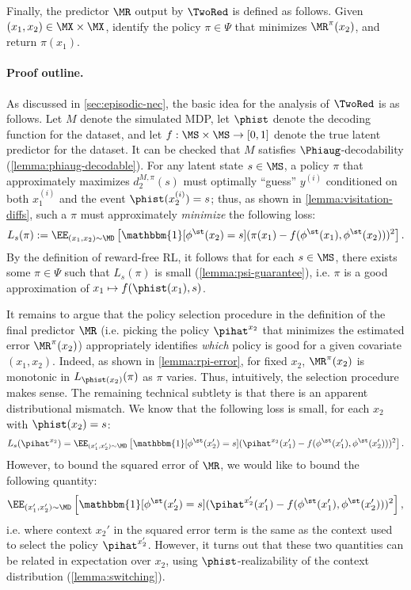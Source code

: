 Finally, the predictor $\MR$ output by $\TwoRed$ is defined as follows. Given $(x_1,x_2) \in \MX\times\MX$, identify the policy $\pi\in\Psi$ that minimizes $\MR^\pi(x_2)$, and return $\pi(x_1)$.

\paragraph{Proof outline.} As discussed in \cref{sec:episodic-nec}, the basic idea for the analysis of $\TwoRed$ is as follows. Let $M$ denote the simulated MDP, let $\phist$ denote the decoding function for the dataset, and let $f:\MS\times\MS\to[0,1]$ denote the true latent predictor for the dataset. It can be checked that $M$ satisfies $\Phiaug$-decodability (\cref{lemma:phiaug-decodable}). For any latent state $s \in \MS$, a policy $\pi$ that approximately maximizes $d^{M,\pi}_2(s)$ must optimally ``guess'' $y^{(i)}$ conditioned on both $x_1^{(i)}$ and the event $\phist(x_2^{(i)}) = s$; thus, as shown in \cref{lemma:visitation-diffs}, such a $\pi$ must approximately \emph{minimize} the following loss:
\[L_s(\pi) := \EE_{(x_1,x_2) \sim \MD} \left[\mathbbm{1}[\phi^\st(x_2) = s] (\pi(x_1) - f(\phi^\st(x_1),\phi^\st(x_2)))^2\right].\]
By the definition of reward-free RL, it follows that for each $s \in \MS$, there exists some $\pi \in \Psi$ such that $L_s(\pi)$ is small (\cref{lemma:psi-guarantee}), i.e. $\pi$ is a good approximation of $x_1 \mapsto f(\phist(x_1),s)$. 

It remains to argue that the policy selection procedure in the definition of the final predictor $\MR$ (i.e. picking the policy $\pihat^{x_2}$ that minimizes the estimated error $\MR^\pi(x_2)$) appropriately identifies \emph{which} policy is good for a given covariate $(x_1,x_2)$. Indeed, as shown in \cref{lemma:rpi-error}, for fixed $x_2$, $\MR^\pi(x_2)$ is monotonic in $L_{\phist(x_2)}(\pi)$ as $\pi$ varies. Thus, intuitively, the selection procedure makes sense. The remaining technical subtlety is that there is an apparent distributional mismatch. We know that the following loss is small, for each $x_2$ with $\phist(x_2)=s$:
\[L_s(\pihat^{x_2}) = \EE_{(x_1',x_2') \sim \MD} \left[\mathbbm{1}[\phi^\st(x_2') = s] (\pihat^{x_2}(x_1') - f(\phi^\st(x_1'),\phi^\st(x_2')))^2\right].\]
However, to bound the squared error of $\MR$, we would like to bound the following quantity:
\[\EE_{(x_1',x_2') \sim \MD}\left[ \mathbbm{1}[\phi^\st(x_2') = s] (\pihat^{x_2'}(x_1') - f(\phi^\st(x_1'),\phi^\st(x_2')))^2\right],\]
i.e. where context $x_2'$ in the squared error term is the same as the context used to select the policy $\pihat^{x_2'}$. However, it turns out that these two quantities can be related in expectation over $x_2$, using $\phist$-realizability of the context distribution (\cref{lemma:switching}).

